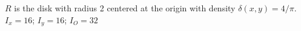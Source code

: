 {$R$ is the disk with radius 2 centered at the origin with density $\delta(x,y) = 4/\pi$. 
}
{$I_x = 16$; $I_y = 16$; $I_O = 32$
}